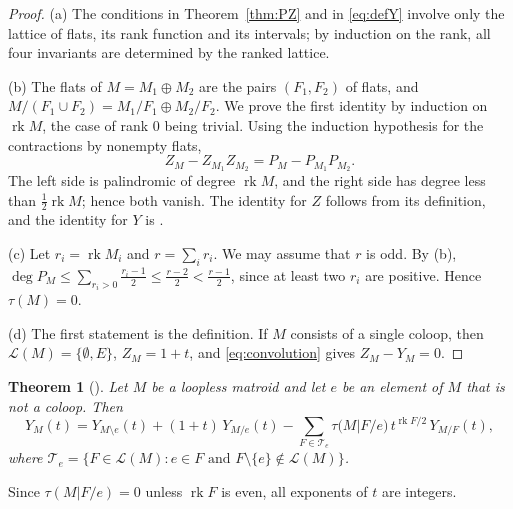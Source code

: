 \documentclass[11pt]{amsart}
\newtheorem{theorem}{Theorem}[section]
\theoremstyle{definition}
\theoremstyle{remark}
\numberwithin{equation}{section}
\newcommand{\rk}{\operatorname{rk}}
\newcommand{\cL}{\mathcal{L}}
\begin{document}
\begin{proof}
(a) The conditions in Theorem~\ref{thm:PZ} and in \eqref{eq:defY} involve only the lattice of flats, its rank function and its intervals; by induction on the rank, all four invariants are determined by the ranked lattice.

(b) The flats of $M=M_1\oplus M_2$ are the pairs $(F_1,F_2)$ of flats, and $M/(F_1\cup F_2)=M_1/F_1\oplus M_2/F_2$. We prove the first identity by induction on $\rk M$, the case of rank $0$ being trivial. Using the induction hypothesis for the contractions by nonempty flats,
\[
Z_M-Z_{M_1}Z_{M_2}=P_M-P_{M_1}P_{M_2}.
\]
The left side is palindromic of degree $\rk M$, and the right side has degree less than $\frac12\rk M$; hence both vanish. The identity for $Z$ follows from its definition, and the identity for $Y$ is \cite[Proposition~2.3]{GRX25}.

(c) Let $r_i=\rk M_i$ and $r=\sum_ir_i$. We may assume that $r$ is odd. By (b), $\deg P_M\le\sum_{r_i>0}\frac{r_i-1}{2}\le\frac{r-2}{2}<\frac{r-1}{2}$, since at least two $r_i$ are positive. Hence $\tau(M)=0$.

(d) The first statement is the definition. If $M$ consists of a single coloop, then $\cL(M)=\{\emptyset,E\}$, $Z_M=1+t$, and \eqref{eq:convolution} gives $Z_M-Y_M=0$.
\end{proof}

\begin{theorem}[{\cite[Theorem~1.4]{BFMN25}}]\label{thm:deletion}
Let $M$ be a loopless matroid and let $e$ be an element of $M$ that is not a coloop. Then
\[
Y_M(t)=Y_{M\setminus e}(t)+(1+t)\,Y_{M/e}(t)-\sum_{F\in\mathcal{T}_e}\tau\bigl(M|F/e\bigr)\,t^{\rk F/2}\,Y_{M/F}(t),
\]
where $\mathcal{T}_e=\{F\in\cL(M):e\in F\text{ and }F\setminus\{e\}\notin\cL(M)\}$.
\end{theorem}

Since $\tau(M|F/e)=0$ unless $\rk F$ is even, all exponents of $t$ are integers.
\end{document}
